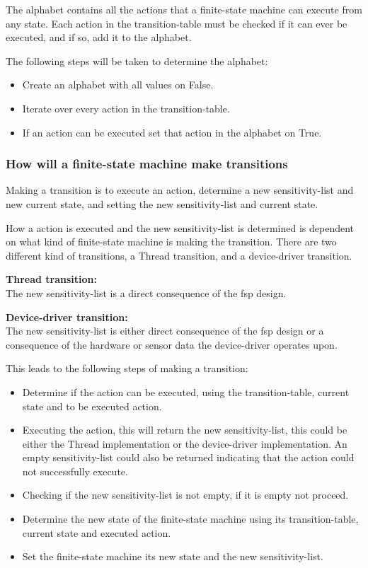 The alphabet contains all the actions that a finite-state machine can
execute from any state. Each action in the transition-table must be
checked if it can ever be executed, and if so, add it to the alphabet.

The following steps will be taken to determine the alphabet:

\begin{itemize}
\tightlist
\item
  Create an alphabet with all values on False.
\item
  Iterate over every action in the transition-table.
\item
  If an action can be executed set that action in the alphabet on True.
\end{itemize}

\hypertarget{how-will-a-finite-state-machine-make-transitions}{%
\subsubsection{How will a finite-state machine make
transitions}\label{how-will-a-finite-state-machine-make-transitions}}

Making a transition is to execute an action, determine a new
sensitivity-list and new current state, and setting the new
sensitivity-list and current state.

How a action is executed and the new sensitivity-list is determined is
dependent on what kind of finite-state machine is making the transition.
There are two different kind of transitions, a Thread transition, and a
device-driver transition.

\textbf{Thread transition:}\\
The new sensitivity-list is a direct consequence of the fsp design.

\textbf{Device-driver transition:}\\
The new sensitivity-list is either direct consequence of the fsp design
or a consequence of the hardware or sensor data the device-driver
operates upon.

This leads to the following steps of making a transition:

\begin{itemize}
\tightlist
\item
  Determine if the action can be executed, using the transition-table,
  current state and to be executed action.
\item
  Executing the action, this will return the new sensitivity-list, this
  could be either the Thread implementation or the device-driver
  implementation. An empty sensitivity-list could also be returned
  indicating that the action could not successfully execute.
\item
  Checking if the new sensitivity-list is not empty, if it is empty not
  proceed.
\item
  Determine the new state of the finite-state machine using its
  transition-table, current state and executed action.
\item
  Set the finite-state machine its new state and the new
  sensitivity-list.
\end{itemize}
